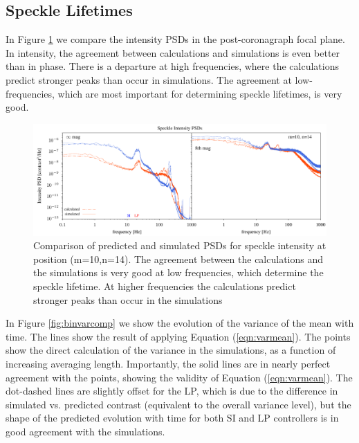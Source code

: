 \documentclass[10pt,preprint]{aastex631}
\begin{document}
\subsection{Speckle Lifetimes}

In Figure \ref{fig:sppsdcomp} we compare the intensity PSDs in the post-coronagraph focal plane.  In intensity, the agreement between calculations and simulations is even better than in phase.  There is a departure at high frequencies, where the calculations predict stronger peaks than occur in simulations. The agreement at low-frequencies, which are most important for determining speckle lifetimes, is very good.

\begin{figure}
\hspace{-0.3in}
\includegraphics[width=6.5in]{spPsdComp_lp_10_14.pdf}
\caption{Comparison of predicted and simulated PSDs for speckle intensity at position (m=10,n=14).  The agreement between the calculations and the simulations is very good at low frequencies, which determine the speckle lifetime.  At higher frequencies the calculations predict stronger peaks than occur in the simulations  \label{fig:sppsdcomp}}
\end{figure}

In Figure \ref{fig:binvarcomp} we show the evolution of the variance of the mean with time.  The lines show the result of applying Equation (\ref{eqn:varmean}). The points show the direct calculation of the variance in the simulations, as a function of increasing averaging length.  Importantly, the solid lines are in nearly perfect agreement with the points, showing the validity of Equation (\ref{eqn:varmean}).  The dot-dashed lines are slightly offset for the LP, which is due to the difference in simulated vs. predicted contrast (equivalent to the overall variance level), but the shape of the predicted evolution with time for both SI and LP controllers is in good agreement with the simulations.
\end{document}
